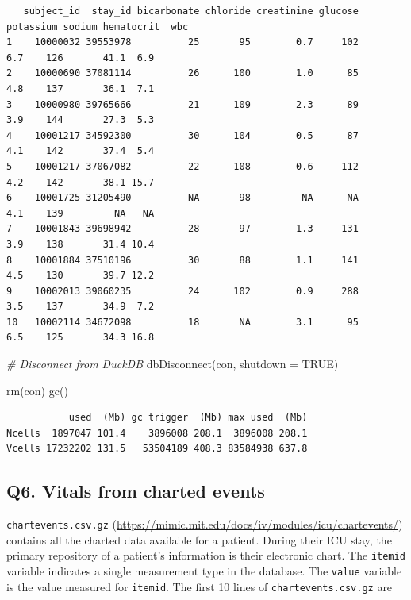 \documentclass[
]{article}
\newenvironment{Shaded}{\begin{snugshade}}{\end{snugshade}}
\newcommand{\AttributeTok}[1]{\textcolor[rgb]{0.77,0.63,0.00}{#1}}
\newcommand{\CommentTok}[1]{\textcolor[rgb]{0.56,0.35,0.01}{\textit{#1}}}
\newcommand{\ConstantTok}[1]{\textcolor[rgb]{0.00,0.00,0.00}{#1}}
\newcommand{\FunctionTok}[1]{\textcolor[rgb]{0.00,0.00,0.00}{#1}}
\newcommand{\NormalTok}[1]{\textcolor[rgb]{0.00,0.00,0.00}{#1}}
\begin{document}
\begin{verbatim}
   subject_id  stay_id bicarbonate chloride creatinine glucose potassium sodium hematocrit  wbc
1    10000032 39553978          25       95        0.7     102       6.7    126       41.1  6.9
2    10000690 37081114          26      100        1.0      85       4.8    137       36.1  7.1
3    10000980 39765666          21      109        2.3      89       3.9    144       27.3  5.3
4    10001217 34592300          30      104        0.5      87       4.1    142       37.4  5.4
5    10001217 37067082          22      108        0.6     112       4.2    142       38.1 15.7
6    10001725 31205490          NA       98         NA      NA       4.1    139         NA   NA
7    10001843 39698942          28       97        1.3     131       3.9    138       31.4 10.4
8    10001884 37510196          30       88        1.1     141       4.5    130       39.7 12.2
9    10002013 39060235          24      102        0.9     288       3.5    137       34.9  7.2
10   10002114 34672098          18       NA        3.1      95       6.5    125       34.3 16.8
\end{verbatim}

\begin{Shaded}
\begin{Highlighting}[]
\CommentTok{\# Disconnect from DuckDB}
\FunctionTok{dbDisconnect}\NormalTok{(con, }\AttributeTok{shutdown =} \ConstantTok{TRUE}\NormalTok{)}

\FunctionTok{rm}\NormalTok{(con)}
\FunctionTok{gc}\NormalTok{()}
\end{Highlighting}
\end{Shaded}

\begin{verbatim}
           used  (Mb) gc trigger  (Mb) max used  (Mb)
Ncells  1897047 101.4    3896008 208.1  3896008 208.1
Vcells 17232202 131.5   53504189 408.3 83584938 637.8
\end{verbatim}

\hypertarget{q6.-vitals-from-charted-events}{%
\subsection{Q6. Vitals from charted
events}\label{q6.-vitals-from-charted-events}}

\texttt{chartevents.csv.gz}
(\url{https://mimic.mit.edu/docs/iv/modules/icu/chartevents/}) contains
all the charted data available for a patient. During their ICU stay, the
primary repository of a patient's information is their electronic chart.
The \texttt{itemid} variable indicates a single measurement type in the
database. The \texttt{value} variable is the value measured for
\texttt{itemid}. The first 10 lines of \texttt{chartevents.csv.gz} are
\end{document}
